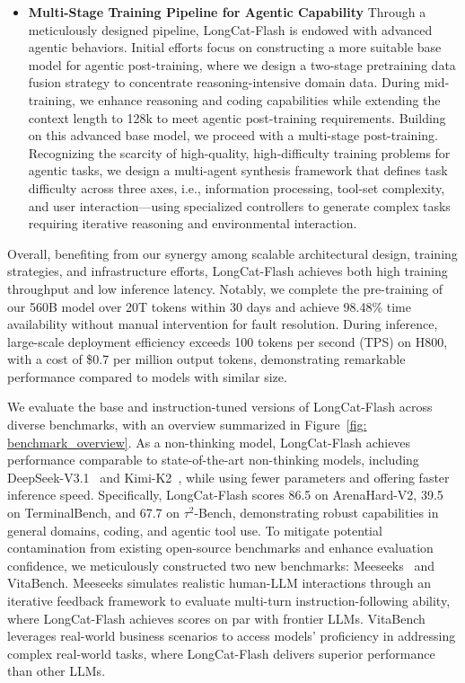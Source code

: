 \documentclass{article}
\newcommand{\longcat}{LongCat-Flash\xspace}
\begin{document}
\begin{itemize}
\item \textbf{Multi-Stage Training Pipeline for Agentic Capability} 
Through a meticulously designed pipeline, \longcat is endowed with advanced agentic behaviors. 
Initial efforts focus on constructing a more suitable base model for agentic post-training, where we design a two-stage pretraining data fusion strategy to concentrate reasoning-intensive domain data. During mid-training, we enhance reasoning and coding capabilities while extending the context length to 128k to meet agentic post-training requirements.
Building on this advanced base model, we proceed with a multi-stage post-training. Recognizing the scarcity of high-quality, high-difficulty training problems for agentic tasks, we design a multi-agent synthesis framework that defines task difficulty across three axes, i.e., information processing, tool-set complexity, and user interaction—using specialized controllers to generate complex tasks requiring iterative reasoning and environmental interaction.


\end{itemize}


Overall, benefiting from our synergy among scalable architectural design, training strategies, and infrastructure efforts, \longcat achieves both high training throughput and low inference latency.
Notably, we complete the pre-training of our 560B model over 20T tokens within 30 days and achieve 98.48\% time availability without manual intervention for fault resolution.
During inference, large-scale deployment efficiency exceeds 100 tokens per second (TPS) on H800, with a cost of \$0.7 per million output tokens, demonstrating remarkable performance compared to models with similar size.


We evaluate the base and instruction-tuned versions of \longcat across diverse benchmarks, with an overview summarized in Figure~\ref{fig: benchmark_overview}. As a non-thinking model, \longcat achieves performance comparable to state-of-the-art non-thinking models, including DeepSeek-V3.1~\citep{deepseekai2025deepseekv3technicalreport} and Kimi-K2~\citep{team2025kimi}, while using fewer parameters and offering faster inference speed. Specifically, \longcat scores 86.5 on ArenaHard-V2, 39.5 on TerminalBench, and 67.7 on $\tau^2$-Bench, demonstrating robust capabilities in general domains, coding, and agentic tool use. To mitigate potential contamination from existing open-source benchmarks and enhance evaluation confidence, we meticulously constructed two new benchmarks: Meeseeks~\citep{meeseeks} and VitaBench. Meeseeks simulates realistic human-LLM interactions through an iterative feedback framework to evaluate multi-turn instruction-following ability, where \longcat achieves scores on par with frontier LLMs. VitaBench leverages real-world business scenarios to access models’ proficiency in addressing complex real-world tasks, where \longcat delivers superior performance than other LLMs.
\end{document}
